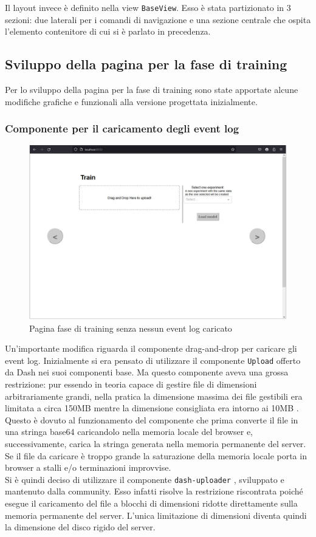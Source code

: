 Il layout invece è definito nella view \texttt{BaseView}. Esso è stata partizionato in 3 sezioni: due laterali per i comandi di navigazione e una sezione centrale che ospita l'elemento contenitore di cui si è parlato in precedenza.


\subsection{Sviluppo della pagina per la fase di training}
Per lo sviluppo della pagina per la fase di training sono state apportate alcune modifiche grafiche e funzionali alla versione progettata inizialmente.

\subsubsection{Componente per il caricamento degli event log}
\label{subsubsec:dash-uploader}

\begin{figure}[H] 
    \centering 
    \includegraphics[width=0.7\columnwidth]{immagini/train-pag-no-event-log.jpg} 
    \caption{Pagina fase di training senza nessun event log caricato}
\end{figure}

Un'importante modifica riguarda il componente \gls{drag-and-drop} per caricare gli event log. Inizialmente si era pensato di utilizzare il componente \texttt{Upload} offerto da Dash nei suoi componenti base. Ma questo componente aveva una grossa restrizione: pur essendo in teoria capace di gestire file di dimensioni arbitrariamente grandi, nella pratica la dimensione massima dei file gestibili era limitata a circa 150MB mentre la dimensione consigliata era intorno ai 10MB \cite{site:upload-max-size}. 
\\
Questo è dovuto al funzionamento del componente che prima converte il file in una stringa \gls{base64} caricandolo nella memoria locale del browser e, successivamente, carica la stringa generata nella memoria permanente del server. Se il file da caricare è troppo grande la saturazione della memoria locale porta in browser a stalli e/o terminazioni improvvise.
\\
Si è quindi deciso di utilizzare il componente \texttt{dash-uploader} \cite{site:dash-uploader}, sviluppato e mantenuto dalla community. Esso infatti risolve la restrizione riscontrata poiché esegue il caricamento del file a blocchi di dimensioni ridotte direttamente sulla memoria permanente del server. L'unica limitazione di dimensioni diventa quindi la dimensione del disco rigido del server.

